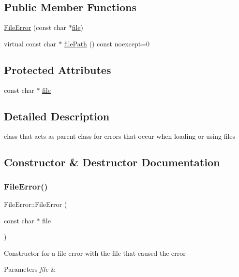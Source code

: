 \subsection*{Public Member Functions}
\begin{DoxyCompactItemize}
\item 
\hyperlink{classFileError_a8330c1e4ec86bfae59e4d9e96b2be59b}{File\+Error} (const char $\ast$\hyperlink{classFileError_a0ea1cc225bf7f8fa47aa0cfa0c2ba685}{file})
\item 
virtual const char $\ast$ \hyperlink{classFileError_a40918f5dda2ee7063bba81d286392cdd}{file\+Path} () const noexcept=0
\end{DoxyCompactItemize}
\subsection*{Protected Attributes}
\begin{DoxyCompactItemize}
\item 
const char $\ast$ \hyperlink{classFileError_a0ea1cc225bf7f8fa47aa0cfa0c2ba685}{file}
\end{DoxyCompactItemize}


\subsection{Detailed Description}
class that acts as parent class for errors that occur when loading or using files 

\subsection{Constructor \& Destructor Documentation}
\mbox{\label{classFileError_a8330c1e4ec86bfae59e4d9e96b2be59b}} 
\subsubsection{\texorpdfstring{File\+Error()}{FileError()}}
{\footnotesize\ttfamily File\+Error\+::\+File\+Error (\begin{DoxyParamCaption}\item[{const char $\ast$}]{file }\end{DoxyParamCaption})}

Constructor for a file error with the file that caused the error 
\begin{DoxyParams}{Parameters}
{\em file} & \\
\hline
\end{DoxyParams}


